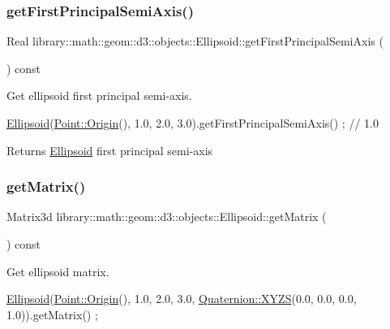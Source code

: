 \subsubsection{\texorpdfstring{get\+First\+Principal\+Semi\+Axis()}{getFirstPrincipalSemiAxis()}}
{\footnotesize\ttfamily Real library\+::math\+::geom\+::d3\+::objects\+::\+Ellipsoid\+::get\+First\+Principal\+Semi\+Axis (\begin{DoxyParamCaption}{ }\end{DoxyParamCaption}) const}



Get ellipsoid first principal semi-\/axis. 


\begin{DoxyCode}
\hyperlink{classlibrary_1_1math_1_1geom_1_1d3_1_1objects_1_1_ellipsoid_aae81fe0edc7f0e8d4590ea89ae73cb14}{Ellipsoid}(\hyperlink{classlibrary_1_1math_1_1geom_1_1d3_1_1objects_1_1_point_ab2a38e285c562e50bf350272c083986f}{Point::Origin}(), 1.0, 2.0, 3.0).getFirstPrincipalSemiAxis() ; \textcolor{comment}{// 1.0}
\end{DoxyCode}


\begin{DoxyReturn}{Returns}
\hyperlink{classlibrary_1_1math_1_1geom_1_1d3_1_1objects_1_1_ellipsoid}{Ellipsoid} first principal semi-\/axis 
\end{DoxyReturn}
\mbox{\label{classlibrary_1_1math_1_1geom_1_1d3_1_1objects_1_1_ellipsoid_ae6af9f16762e8c38b0a71c306d29ddbf}} 
\subsubsection{\texorpdfstring{get\+Matrix()}{getMatrix()}}
{\footnotesize\ttfamily Matrix3d library\+::math\+::geom\+::d3\+::objects\+::\+Ellipsoid\+::get\+Matrix (\begin{DoxyParamCaption}{ }\end{DoxyParamCaption}) const}



Get ellipsoid matrix. 


\begin{DoxyCode}
\hyperlink{classlibrary_1_1math_1_1geom_1_1d3_1_1objects_1_1_ellipsoid_aae81fe0edc7f0e8d4590ea89ae73cb14}{Ellipsoid}(\hyperlink{classlibrary_1_1math_1_1geom_1_1d3_1_1objects_1_1_point_ab2a38e285c562e50bf350272c083986f}{Point::Origin}(), 1.0, 2.0, 3.0, \hyperlink{classlibrary_1_1math_1_1geom_1_1trf_1_1rot_1_1_quaternion_afff9523c7dcbfbbc521736121e62ad41}{Quaternion::XYZS}(0.0, 0.0, 
      0.0, 1.0)).getMatrix() ;
\end{DoxyCode}


